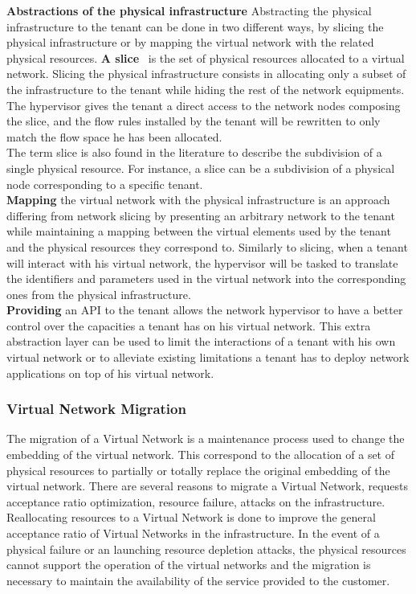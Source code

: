 \textbf{Abstractions of the physical infrastructure}
Abstracting the physical infrastructure to the tenant can be done in two different ways, by slicing the physical infrastructure or by mapping the virtual network with the related physical resources.
\textbf{A slice}~\cite{FlowVisor-Sherwood2009} is the set of physical resources allocated to a virtual network.
Slicing the physical infrastructure consists in allocating only a subset of the infrastructure to the tenant while hiding the rest of the network equipments.
The hypervisor gives the tenant a direct access to the network nodes composing the slice, and the flow rules installed by the tenant will be rewritten to only match the flow space he has been allocated.\\
The term slice is also found in the literature to describe the subdivision of a single physical resource. For instance, a slice can be a subdivision of a physical node corresponding to a specific tenant.\\
\textbf{Mapping} the virtual network with the physical infrastructure is an approach differing from network slicing by presenting an arbitrary network to the tenant while maintaining a mapping between the virtual elements used by the tenant and the physical resources they correspond to.
Similarly to slicing, when a tenant will interact with his virtual network, the hypervisor will be tasked to translate the identifiers and parameters used in the virtual network into the corresponding ones from the physical infrastructure.\\
\textbf{Providing} an API to the tenant allows the network hypervisor to have a better control over the capacities a tenant has on his virtual network. This extra abstraction layer can be used to limit the interactions of a tenant with his own virtual network or to alleviate existing limitations a tenant has to deploy network applications on top of his virtual network. 



\subsubsection{Virtual Network Migration}
The migration of a Virtual Network is a maintenance process used to change the embedding of the virtual network. 
This correspond to the allocation of a set of physical resources to partially or totally replace the original embedding of the virtual network.
There are several reasons to migrate a Virtual Network, requests acceptance ratio optimization, resource failure, attacks on the infrastructure.
Reallocating resources to a Virtual Network is done to improve the general acceptance ratio of Virtual Networks in the infrastructure.
In the event of a physical failure or an launching resource depletion attacks, the physical resources cannot support the operation of the virtual networks and the migration is necessary to maintain the availability of the service provided to the customer.


